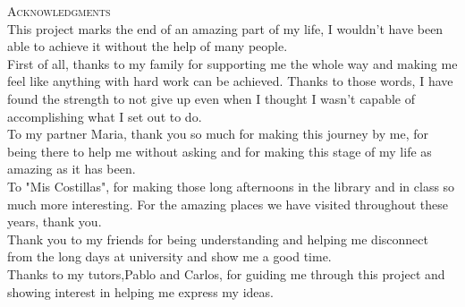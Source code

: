 \textsc{\Large Acknowledgments}\\[0.5cm]


This project marks the end of an amazing part of my life, I wouldn't have been able to achieve it without the help of many people.\\

First of all, thanks to my family for supporting me the whole way and making  me feel like anything with hard work can be achieved. Thanks to those words, I have found the strength to not give up even when I thought I wasn't capable of accomplishing what I set out to do.\\

To my partner Maria, thank you so much for making this journey by me, for being there to help me without asking and for making this stage of my life as amazing as it has been. \\

To "Mis Costillas", for making those long afternoons in the library and in class so much more interesting. For the amazing places we have visited throughout these years, thank you.\\

Thank you to my friends for being understanding and helping me disconnect from the long days at university and show me a good time.\\

Thanks to my tutors,Pablo and Carlos, for guiding me through this project and showing interest in helping me express my ideas.\\
















